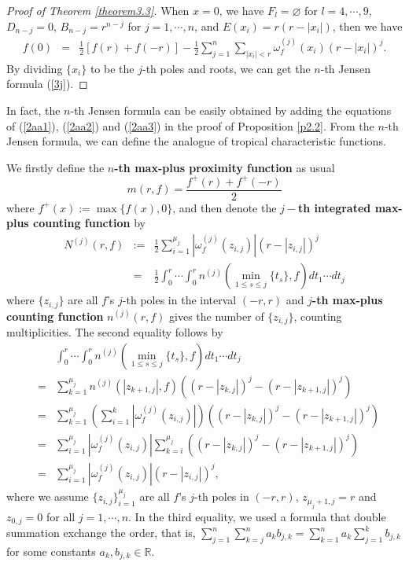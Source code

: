 \documentclass{article}
\begin{document}
\begin{proof}[Proof of Theorem \ref{theorem3.3}]
When $x=0$, we have $F_{l}=\varnothing$ for $l=4, \cdots, 9$, $D_{n-j}=0$, $B_{n-j}=r^{n-j}$ for $j=1, \cdots, n$, and $E(x_{i})=r(r-|x_{i}|)$, then we have
\begin{eqnarray*}
    f(0)&=&\frac{1}{2}[f(r)+f(-r)]-\frac{1}{2}\sum_{j=1}^{n}\sum_{|x_{i}|<r}\omega_{f}^{(j)}(x_{i})(r-|x_{i}|)^{j}.
\end{eqnarray*}
By dividing $\{x_{i}\}$ to be the $j$-th poles and roots, we can get the $n$-th Jensen formula (\ref{3j}).
\end{proof}

In fact, the $n$-th Jensen formula can be easily obtained by adding the equations of (\ref{2aa1}), (\ref{2aa2}) and (\ref{2aa3}) in the proof of Proposition \ref{p2.2}. From the $n$-th Jensen formula, we can define the analogue of tropical characteristic functions.

We firstly define the \textbf{$n$-th max-plus proximity function} as usual
    \begin{equation*}
        m(r, f)=\frac{f^{+}(r)+f^{+}(-r)}{2}
    \end{equation*}
where $f^{+}(x):=\max\{f(x), 0\}$, and then denote the \textbf{$j-$th integrated max-plus counting function} by
    \begin{eqnarray}\label{3aN}
        N^{(j)}(r, f)&:=&\frac{1}{2}\sum_{i=1}^{\mu_{j}}|\omega_{f}^{(j)}(z_{i, j})|(r-|z_{i, j}|)^{j}\nonumber\\
        &=&\frac{1}{2}\int_{0}^{r}\cdots\int_{0}^{r}n^{(j)}\left(\min_{1\leq s \leq j}\{t_{s}\}, f\right)dt_{1}\cdots dt_{j}
    \end{eqnarray}
where $\{z_{i, j}\}$ are all $f$'s $j$-th poles in the interval $(-r, r)$ and \textbf{$j$-th max-plus counting function} $n^{(j)}(r, f)$ gives the number of $\{z_{i, j}\}$, counting multiplicities. The second equality follows by
    \begin{eqnarray*}
        &&\int_{0}^{r}\cdots\int_{0}^{r}n^{(j)}\left(\min_{1\leq s \leq j}\{t_{s}\}, f\right)dt_{1}\cdots dt_{j}\\
        &=&\sum_{k=1}^{\mu_{j}}n^{(j)}(|z_{k+1, j}|, f)\left((r-|z_{k, j}|)^{j}-(r-|z_{k+1, j}|)^{j}\right)\\
        &=&\sum_{k=1}^{\mu_{j}}\left(\sum_{i=1}^{k}|\omega_{f}^{(j)}(z_{i, j})|\right)\left((r-|z_{k, j}|)^{j}-(r-|z_{k+1, j}|)^{j}\right)\\
        &=&\sum_{i=1}^{\mu_{j}}|\omega_{f}^{(j)}(z_{i, j})|\sum_{k=i}^{\mu_{j}}\left((r-|z_{k, j}|)^{j}-(r-|z_{k+1, j}|)^{j}\right)\\
        &=&\sum_{i=1}^{\mu_{j}}|\omega_{f}^{(j)}(z_{i, j})|(r-|z_{i, j}|)^{j},
    \end{eqnarray*}
    where we assume $\{z_{i, j}\}_{i=1}^{\mu_{j}}$ are all $f$'s $j$-th poles in $(-r, r)$, $z_{\mu_{j}+1, j}=r$ and $z_{0, j}=0$ for all $j=1, \cdots, n$. In the third equality, we used a formula that double summation exchange the order, that is, $\sum_{j=1}^{n}\sum_{k=j}^{n}a_{k}b_{j,k}=\sum_{k=1}^{n}a_{k}\sum_{j=1}^{k}b_{j,k}$ for some constants $a_{k}, b_{j, k}\in\mathbb{R}$. 
    
\end{document}

